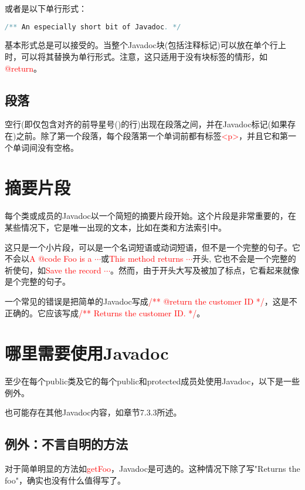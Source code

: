 \documentclass[cn,11pt,chinese]{elegantbook}
\begin{document}
或者是以下单行形式：
\begin{lstlisting}[language=java]
/** An especially short bit of Javadoc. */
\end{lstlisting}

基本形式总是可以接受的。当整个Javadoc块(包括注释标记)可以放在单个行上时，可以将其替换为单行形式。注意，这只适用于没有块标签的情形，如\textcolor{red}{@return}。

\subsection{段落}
空行(即仅包含对齐的前导星号(\textcolor{red}{\textasteriskcentered})的行)出现在段落之间，并在Javadoc标记(如果存在)之前。除了第一个段落，每个段落第一个单词前都有标签\textcolor{red}{<p>}，并且它和第一个单词间没有空格。

\section{摘要片段}
每个类或成员的Javadoc以一个简短的摘要片段开始。这个片段是非常重要的，在某些情况下，它是唯一出现的文本，比如在类和方法索引中。

这只是一个小片段，可以是一个名词短语或动词短语，但不是一个完整的句子。它不会以\textcolor{red}{A {@code Foo} is a $\cdots$}或\textcolor{red}{This method returns $\cdots$}开头, 它也不会是一个完整的祈使句，如\textcolor{red}{Save the record $\cdots$}。然而，由于开头大写及被加了标点，它看起来就像是个完整的句子。

\begin{remark}
	一个常见的错误是把简单的Javadoc写成\textcolor{red}{/** @return the customer ID */}，这是不正确的。它应该写成\textcolor{red}{/** Returns the customer ID. */}。
\end{remark}

\section{哪里需要使用Javadoc}
至少在每个public类及它的每个public和protected成员处使用Javadoc，以下是一些例外。

也可能存在其他Javadoc内容，如章节7.3.3所述。

\subsection{例外：不言自明的方法}
对于简单明显的方法如\textcolor{red}{getFoo}，Javadoc是可选的。这种情况下除了写"Returns the foo"，确实也没有什么值得写了。
\end{document}
